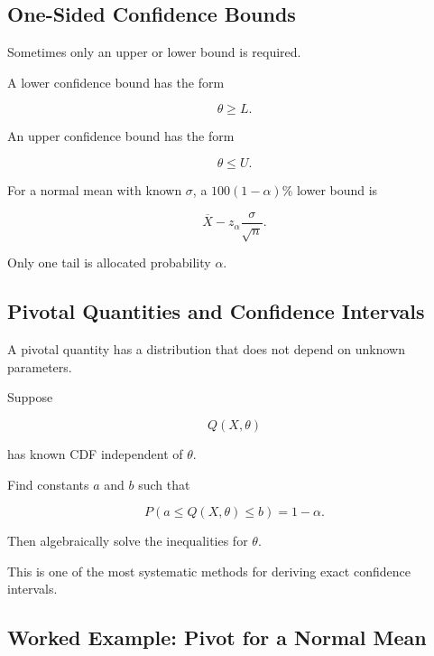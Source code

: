 \subsection{One-Sided Confidence Bounds}
\label{subsec:one-sided-confidence-bounds}

Sometimes only an upper or lower bound is required.

A lower confidence bound has the form

\[
\boxed{
\theta\geq L.
}
\]

An upper confidence bound has the form

\[
\boxed{
\theta\leq U.
}
\]

For a normal mean with known \(\sigma\), a \(100(1-\alpha)\%\) lower
bound is

\[
\boxed{
\overline{X}
-
z_\alpha
\frac{\sigma}{\sqrt{n}}.
}
\]

Only one tail is allocated probability \(\alpha\).

\subsection{Pivotal Quantities and Confidence Intervals}
\label{subsec:pivotal-confidence-intervals}

A pivotal quantity has a distribution that does not depend on unknown
parameters.

Suppose

\[
Q(X,\theta)
\]

has known CDF independent of \(\theta\).

Find constants \(a\) and \(b\) such that

\[
P
(
a\leq Q(X,\theta)\leq b
)
=
1-\alpha.
\]

Then algebraically solve the inequalities for \(\theta\).

This is one of the most systematic methods for deriving exact confidence
intervals.

\subsection{Worked Example: Pivot for a Normal Mean}
\label{subsec:worked-pivot-normal-mean}

